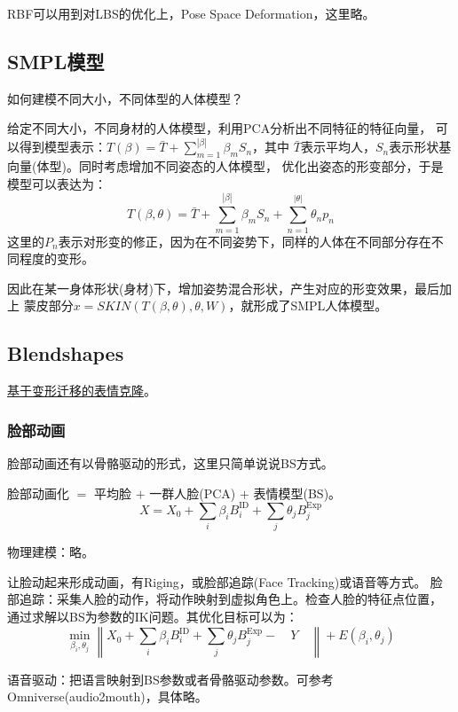 \documentclass[lang=cn,newtx,10pt,scheme=chinese]{elegantbook}
\begin{document}
RBF可以用到对LBS的优化上，Pose Space Deformation，这里略。


\subsection{SMPL模型}
如何建模不同大小，不同体型的人体模型？

给定不同大小，不同身材的人体模型，利用PCA分析出不同特征的特征向量，
可以得到模型表示：$T(\beta)=\bar{T}+\sum_{m=1}^{|\beta|} \beta_m S_n$，其中
$\bar{T}$表示平均人，$S_n$表示形状基向量(体型)。同时考虑增加不同姿态的人体模型，
优化出姿态的形变部分，于是模型可以表达为：
\begin{equation}
  T(\beta, \theta)=\bar{T}+\sum_{m=1}^{|\beta|} \beta_m S_n+\sum_{n=1}^{|\theta|} \theta_n p_n
\end{equation}
这里的$P_n$表示对形变的修正，因为在不同姿势下，同样的人体在不同部分存在不同程度的变形。

因此在某一身体形状(身材)下，增加姿势混合形状，产生对应的形变效果，最后加上
蒙皮部分$x=SKIN(T(\beta, \theta), \theta, W)$，就形成了SMPL人体模型。 

\subsection{Blendshapes}
\href{http://www.cs.unc.edu/~jdh/documents/thesis_master.pdf}{基于变形迁移的表情克隆}。

\subsubsection{脸部动画}
脸部动画还有以骨骼驱动的形式，这里只简单说说BS方式。

脸部动画化 $=$ 平均脸 $+$ 一群人脸(PCA) $+$  表情模型(BS)。
$$
X=X_0+\sum_i \beta_i B_i^{\mathrm{ID}}+\sum_j \theta_j B_j^{\operatorname{Exp}}
$$

物理建模：略。

让脸动起来形成动画，有Riging，或脸部追踪(Face Tracking)或语音等方式。
脸部追踪：采集人脸的动作，将动作映射到虚拟角色上。检查人脸的特征点位置，
通过求解以BS为参数的IK问题。其优化目标可以为：
\begin{equation}
  \min _{\beta_i, \theta_j}\left\|X_0+\sum_i \beta_i B_i^{\mathrm{ID}}+\sum_j \theta_j B_j^{\operatorname{Exp}}-\quad Y \quad\right\|+E\left(\beta_i, \theta_j\right)
\end{equation}

语音驱动：把语言映射到BS参数或者骨骼驱动参数。可参考Omniverse(audio2mouth)，具体略。
\end{document}
